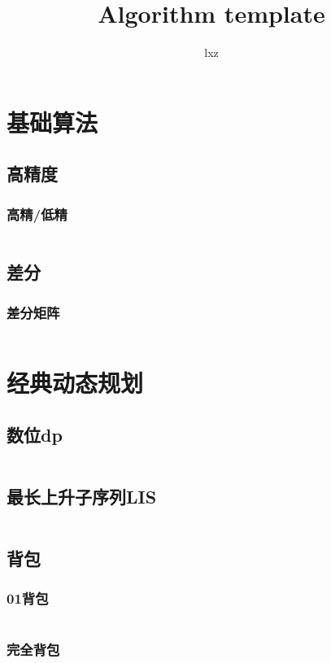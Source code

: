 \documentclass[a4paper,11pt]{article}
\author{lxz}
\title{Algorithm template}
\begin{document}
 
\maketitle %
\newpage %
\tableofcontents %
\newpage
\section{基础算法} %
\subsection{高精度} %
\subsubsection{高精/低精} %
\inputminted[breaklines]{c++}{基础算法/高精除低精.cpp} %
\subsection{差分} %
\subsubsection{差分矩阵} %
\inputminted[breaklines]{c++}{基础算法/差分矩阵.cpp}

\newpage
\section{经典动态规划}
\subsection{数位dp} %
\inputminted[breaklines]{c++}{经典动态规划/数位dp.cpp}
\subsection{最长上升子序列LIS} %
\inputminted[breaklines]{c++}{经典动态规划/LIS.cpp}
\subsection{背包} %
\subsubsection{01背包} %
\inputminted[breaklines]{c++}{经典动态规划/01背包.cpp}
\subsubsection{完全背包} %
\inputminted[breaklines]{c++}{经典动态规划/完全背包.cpp}
\end{document}
